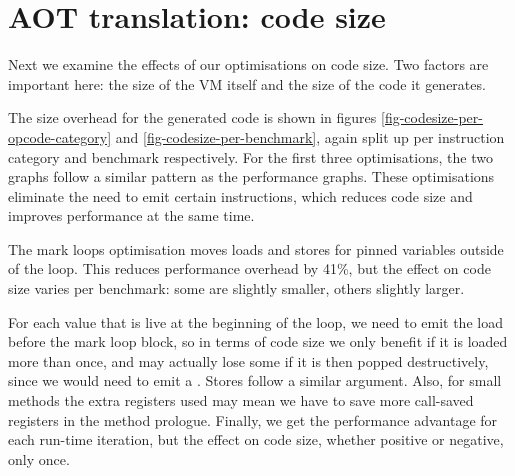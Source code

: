

\section{AOT translation: code size}
\label{sec-evaluation-aot-translation-code-size}
Next we examine the effects of our optimisations on code size. Two factors are important here: the size of the VM itself and the size of the code it generates.

The size overhead for the generated code is shown in figures \ref{fig-codesize-per-opcode-category} and \ref{fig-codesize-per-benchmark}, again split up per instruction category and benchmark respectively. For the first three optimisations, the two graphs follow a similar pattern as the performance graphs. These optimisations eliminate the need to emit certain instructions, which reduces code size and improves performance at the same time.

The mark loops optimisation moves loads and stores for pinned variables outside of the loop. This reduces performance overhead by 41\%, but the effect on code size varies per benchmark: some are slightly smaller, others slightly larger.

For each value that is live at the beginning of the loop, we need to emit the load before the mark loop block, so in terms of code size we only benefit if it is loaded more than once, and may actually lose some if it is then popped destructively, since we would need to emit a . Stores follow a similar argument. Also, for small methods the extra registers used may mean we have to save more call-saved registers in the method prologue. Finally, we get the performance advantage for each run-time iteration, but the effect on code size, whether positive or negative, only once.

